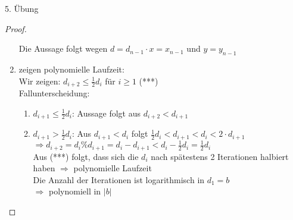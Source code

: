 \begin{section}{5. Übung}
\begin{proof}
\begin{enumerate}
   Die Aussage folgt wegen $d=d_{n-1} \cdot x = x_{n-1}$ und $y = y_{n-1}$
   \item zeigen polynomielle Laufzeit:\\
   Wir zeigen: $d_{i+2}\leq\frac{1}{2}d_i$ für $i \geq 1$ (***)\\
   Fallunterscheidung:
   \begin{enumerate}[1)]
    \item $d_{i+1} \leq \frac{1}{2}d_i$: Aussage folgt aus $d_{i+2} < d_{i+1}$
    \item $d_{i+1} > \frac{1}{2}d_i$: Aus $d_{i+1} < d_i$ folgt $\frac{1}{2}d_i < d_{i+1} < d_i < 2\cdot d_{i+1}$\\
    $\Rightarrow d_{i+2} = d_i \% d_{i+1} = d_i - d_{i+1} < d_i - \frac{1}{2}d_i = \frac{1}{2}d_i$\\
    Aus (***) folgt, dass sich die $d_i$ nach spätestens 2 Iterationen halbiert haben $\Rightarrow$ polynomielle Laufzeit\\
    Die Anzahl der Iterationen ist logarithmisch in $d_1 = b$\\
    $\Rightarrow$ polynomiell in $|b|$
   \end{enumerate}

   
   
  \end{enumerate}

 \end{proof}


\end{section}
